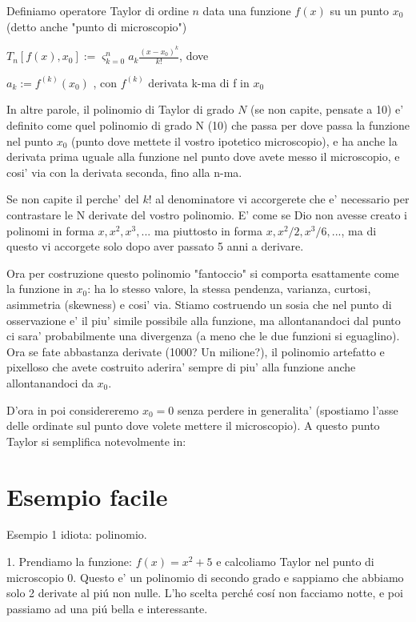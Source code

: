 \begin{definizione}[Taylor] Definiamo operatore Taylor di ordine $n$ data una funzione $f(x)$ su un punto $x_0$ 
    (detto anche "punto di microscopio")
    

    $T_n[f(x), x_0] := \varsigma_{k=0}^n a_k \frac{(x-x_0)^k}{k!}$, dove 
    

    $ a_k := f^(k)(x_0)$ , con $f^{(k)}$ derivata k-ma di f in $x_0$


\end{definizione}

In altre parole, il polinomio di Taylor di grado $N$ (se non capite, pensate a 10) e' definito come quel polinomio di grado N (10) che passa
per dove passa la funzione nel punto $x_0$ (punto dove mettete il vostro ipotetico microscopio), e ha anche la derivata prima uguale alla funzione 
nel punto dove avete messo il microscopio, e cosi' via con la derivata seconda, fino alla n-ma. 

Se non capite il perche' del $k!$ al denominatore vi accorgerete che e' necessario per contrastare le N derivate del vostro polinomio. E' come se Dio
non avesse creato i polinomi in forma $x, x^2, x^3, ...$ ma piuttosto in forma $x, x^2/2, x^3/6, ...$, ma di questo vi accorgete solo dopo aver passato 5 anni a derivare.

Ora per costruzione questo polinomio "fantoccio" si comporta esattamente come la funzione in $x_0$: ha lo stesso valore, la stessa pendenza, varianza, curtosi, asimmetria (skewness) e cosi' via.
Stiamo costruendo un sosia che nel punto di osservazione e' il piu' simile possibile alla funzione, ma allontanandoci dal punto ci sara' probabilmente una divergenza (a meno che le due funzioni si eguaglino). 
Ora se fate abbastanza derivate (1000? Un milione?), il polinomio artefatto e pixelloso che avete costruito aderira' sempre di piu' alla funzione anche allontanandoci da $x_0$.

D'ora in poi considereremo $x_0 = 0$ senza perdere in generalita' (spostiamo l'asse delle ordinate sul punto dove volete mettere il microscopio). A questo punto Taylor si semplifica notevolmente in:


\section{Esempio facile}

Esempio 1 idiota: polinomio.

1. Prendiamo la funzione: $f(x) = x^2 + 5$ e calcoliamo Taylor nel punto di microscopio $0$.
Questo e' un polinomio di secondo grado e sappiamo che abbiamo solo 2 derivate al pi\'u non nulle.
L'ho scelta perch\'e cos\'i non facciamo notte, e poi passiamo ad una pi\'u bella e interessante.

